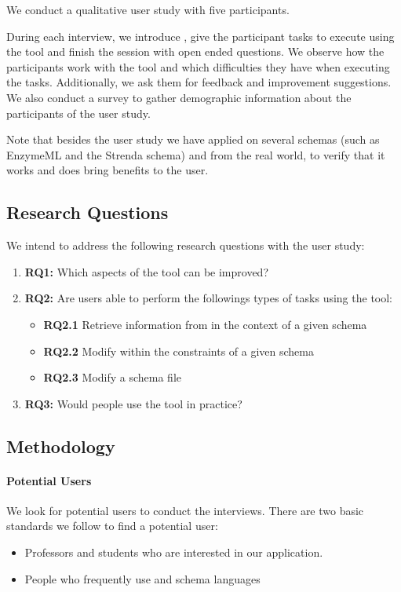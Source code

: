 We conduct a qualitative user study with five participants.

During each interview, we introduce \toolname{}, give the participant tasks to execute using the tool and finish the session with open ended questions.
We observe how the participants work with the tool and which difficulties they have when executing the tasks.
Additionally, we ask them for feedback and improvement suggestions.
We also conduct a survey to gather demographic information about the participants of the user study.

Note that besides the user study we have applied \toolname{} on several schemas (such as EnzymeML\cite{TODO} and the Strenda schema\cite{TODO}) and \cfgfiles{} from the real world, to verify that it works and does bring benefits to the user.

\subsection{Research Questions}\label{subsec:research_questions}
We intend to address the following research questions with the user study:
\begin{enumerate}
	\item \textbf{RQ1:} Which aspects of the tool can be improved?
	\item \textbf{RQ2:} Are users able to perform the followings types of tasks using the tool:
	 \begin{itemize}
			\item \textbf{RQ2.1} Retrieve information from \cfgfiles{} in the context of a given schema
			\item \textbf{RQ2.2} Modify \cfgfiles{} within the constraints of a given schema
			\item \textbf{RQ2.3} Modify a schema file
		\end{itemize}
	\item \textbf{RQ3:} Would people use the tool in practice?
\end{enumerate}

\subsection{Methodology}\label{subsec:methodology} %

\paragraph{Potential Users}
We look for potential users to conduct the interviews.
There are two basic standards we follow to find a potential user:
\begin{itemize}
    \item Professors and students who are interested in our application.
    \item People who frequently use \cfgfiles and schema languages
\end{itemize}

